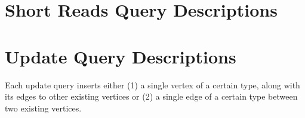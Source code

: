 \section{Short Reads Query Descriptions}









\section{Update Query Descriptions}

Each update query inserts either (1) a single vertex of a certain type, along with its edges to other existing vertices or (2) a single edge of a certain type between two existing vertices.









